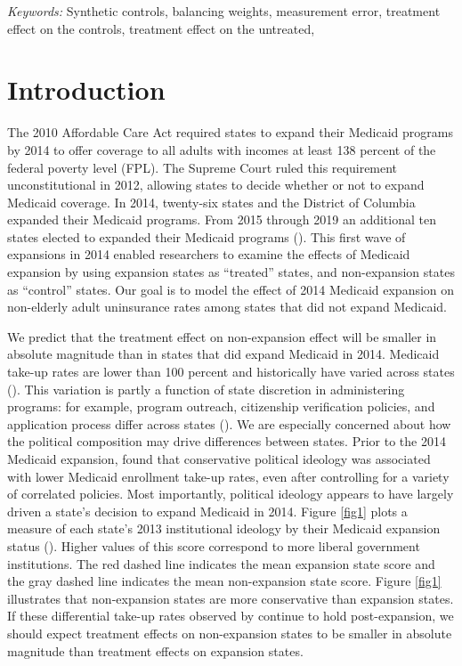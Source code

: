 \documentclass[12pt]{article}
\def\spacingset#1{\renewcommand{\baselinestretch}%
{#1}\small\normalsize} \spacingset{1}
\begin{document}
\noindent%
{\it Keywords:} Synthetic controls, balancing weights, measurement error, treatment effect on the controls, treatment effect on the untreated,
\vfill

\newpage
\spacingset{1.45} %

\maketitle

\section{Introduction}

The 2010 Affordable Care Act required states to expand their Medicaid programs by 2014 to offer coverage to all adults with incomes at least 138 percent of the federal poverty level (FPL). The Supreme Court ruled this requirement unconstitutional in 2012, allowing states to decide whether or not to expand Medicaid coverage. In 2014, twenty-six states and the District of Columbia expanded their Medicaid programs. From 2015 through 2019 an additional ten states elected to expanded their Medicaid programs (\cite{KFF}). This first wave of expansions in 2014 enabled researchers to examine the effects of Medicaid expansion by using expansion states as ``treated'' states, and non-expansion states as ``control'' states. Our goal is to model the effect of 2014 Medicaid expansion on non-elderly adult uninsurance rates among states that did not expand Medicaid. 

We predict that the treatment effect on non-expansion effect will be smaller in absolute magnitude than in states that did expand Medicaid in 2014. Medicaid take-up rates are lower than 100 percent and historically have varied across states (\cite{sommers2012understanding}). This variation is partly a function of state discretion in administering programs: for example, program outreach, citizenship verification policies, and application process differ across states (\cite{courtemanche2017early}). We are especially concerned about how the political composition may drive differences between states. Prior to the 2014 Medicaid expansion, \cite{sommers2012understanding} found that conservative political ideology was associated with lower Medicaid enrollment take-up rates, even after controlling for a variety of correlated policies. Most importantly, political ideology appears to have largely driven a state's decision to expand Medicaid in 2014. Figure \ref{fig1} plots a measure of each state's 2013 institutional ideology by their Medicaid expansion status (\cite{fording}). Higher values of this score correspond to more liberal government institutions. The red dashed line indicates the mean expansion state score and the gray dashed line indicates the mean non-expansion state score. Figure \ref{fig1} illustrates that non-expansion states are more conservative than expansion states.  If these differential take-up rates observed by \cite{sommers2012understanding} continue to hold post-expansion, we should expect treatment effects on non-expansion states to be smaller in absolute magnitude than treatment effects on expansion states. 
\end{document}

